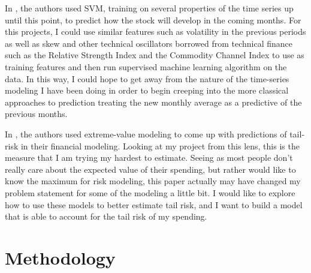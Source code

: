 \documentclass[11pt,a4paper]{article}
\newenvironment{updatematerial}{
\color{blue}
}{

}
\begin{document}
\begin{updatematerial}
	In \cite{SVMFinance}, the authors used SVM, training on several properties of the time series up until this point, to predict how the stock will develop in the coming months. For this projects, I could use similar features such as volatility in the previous periods as well as skew and other technical oscillators borrowed from technical finance such as the Relative Strength Index and the Commodity Channel Index to use as training features and then run supervised machine learning algorithm on the data. In this way, I could hope to get away from the nature of the time-series modeling I have been doing in order to begin creeping into the more classical approaches to prediction treating the new monthly average as a predictive of the previous months. 
	
	In \cite{LongTail}, the authors used extreme-value modeling to come up with predictions of tail-risk in their financial modeling. Looking at my project from this lens, this is the measure that I am trying my hardest to estimate. Seeing as most people don't really care about the expected value of their spending, but rather would like to know the maximum for risk modeling, this paper actually may have changed my problem statement for some of the modeling a little bit. I would like to explore how to use these models to better estimate tail risk, and I want to build a model that is able to account for the tail risk of my spending. 
\end{updatematerial}


\section{Methodology} \label{sec:methodology}
\end{document}
